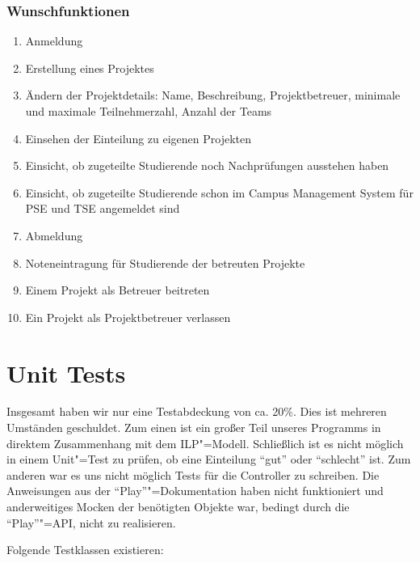 \documentclass[parskip=full]{scrartcl}
\newcommand{\swtLabel}[1]{\textbf{/#1\arabic*0/}}
\begin{document}
\subsubsection{Wunschfunktionen}
\begin{enumerate}[label=\swtLabel{FA}, resume]
  \item Anmeldung
  \item Erstellung eines Projektes
  \item Ändern der Projektdetails: Name, Beschreibung, Projektbetreuer, minimale
und maximale Teilnehmerzahl, Anzahl der Teams
\item Einsehen der Einteilung zu eigenen Projekten
\item Einsicht, ob zugeteilte Studierende noch Nachprüfungen ausstehen haben
\item Einsicht, ob zugeteilte Studierende schon im Campus Management System für
PSE und TSE angemeldet sind
\item Abmeldung
\item Noteneintragung für Studierende der betreuten Projekte
\item Einem Projekt als Betreuer beitreten
\item Ein Projekt als Projektbetreuer verlassen
\end{enumerate}

\section{Unit Tests}

Insgesamt haben wir nur eine Testabdeckung von ca. 20\%. Dies ist mehreren Umständen geschuldet. 
Zum einen ist ein großer Teil unseres Programms in direktem Zusammenhang mit dem ILP"=Modell. Schließlich ist es nicht möglich in einem Unit"=Test zu prüfen, ob eine Einteilung \enquote{gut} oder \enquote{schlecht} ist. 
Zum anderen war es uns nicht möglich Tests für die Controller zu schreiben. Die Anweisungen aus der \enquote{Play}"=Dokumentation haben nicht funktioniert und anderweitiges Mocken der benötigten Objekte war, bedingt durch die \enquote{Play}"=API, nicht zu realisieren.

Folgende Testklassen existieren:
\end{document}
